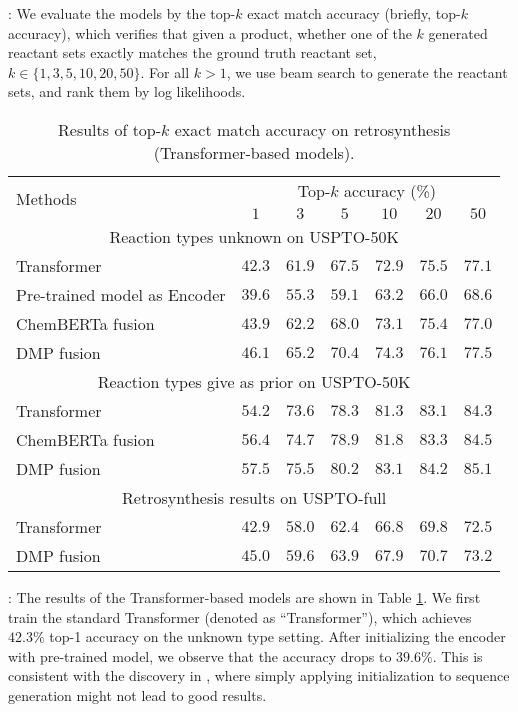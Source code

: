 \documentclass{article}
\newcommand{\ourM}{DMP}
\begin{document}
: We evaluate the models by the top-$k$ exact match accuracy (briefly, top-$k$ accuracy), which verifies that given a product, whether one of the $k$ generated reactant sets exactly matches the ground truth reactant set, $k\in\{1, 3, 5, 10, 20, 50\}$. For all $k>1$, we use beam search to generate the reactant sets, and rank them by log likelihoods.
\begin{table}[!htbp]
    \centering
    \small
    \begin{tabular}{lcccccc}
    \toprule
         \multirow{2}{*}{Methods} & \multicolumn{6}{c}{Top-$k$ accuracy (\%)}  \\
         \cmidrule{2-7}
         & $1$& $3$ & $5$& $10$&$20$ & $50$\\
         \midrule
         \multicolumn{7}{c}{Reaction types unknown on USPTO-50K}\\
         \midrule
         Transformer & $42.3$ & $61.9$ & $67.5$ & $72.9$ & $75.5$ & $77.1$ \\
         Pre-trained model as Encoder& $39.6$&$55.3$&$59.1$&$63.2$&$66.0$&$68.6$\\
         ChemBERTa \cite{chithrananda2020chemberta} fusion &$43.9$&$62.2$&$68.0$&$73.1$&$75.4$&$77.0$\\
         \ourM{} fusion &$46.1$&$65.2$&$70.4$&$74.3$&$76.1$&$77.5$ \\
         \midrule
         \multicolumn{7}{c}{Reaction types give as prior on USPTO-50K}\\
         \midrule
         Transformer & $54.2$ & $73.6$ & $78.3$&$81.3$& $83.1$&$84.3$ \\
         ChemBERTa fusion &$56.4$&$74.7$&$78.9$&$81.8$&$83.3$&$84.5$\\
          \ourM{} fusion &$57.5$&$75.5$&$80.2$&$83.1$&$84.2$&$85.1$\\
\midrule
         \multicolumn{7}{c}{Retrosynthesis results on USPTO-full}\\
         \midrule
         Transformer & $42.9$ & $58.0$ & $62.4$ & $66.8$ &$69.8$& $72.5$ \\
\ourM{} fusion &$45.0$&$59.6$&$63.9$&$67.9$&$70.7$&$73.2$ \\
         \bottomrule
    \end{tabular}
    \caption{Results of top-$k$ exact match accuracy on retrosynthesis (Transformer-based models).}
    \label{tab:retrosys}
\end{table}


: The results of the Transformer-based models are shown in Table \ref{tab:retrosys}. We first train the standard Transformer (denoted as ``Transformer''), which achieves $42.3\%$ top-1 accuracy on the unknown type setting. After initializing the encoder with pre-trained model, we observe that the accuracy drops to $39.6\%$. This is consistent with the discovery in \cite{zhu2020incorporating}, where simply applying initialization to sequence generation might not lead to good results. 
\end{document}

